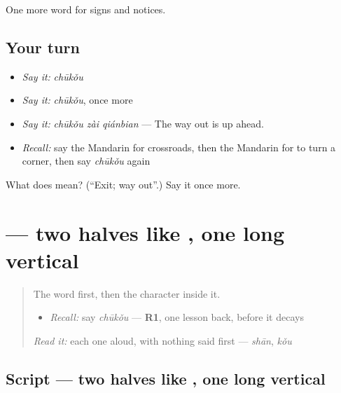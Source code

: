\begin{grammarlens}[title={What you've built}]
One more word for signs and notices.
\end{grammarlens}

\subsection*{Your turn}
\begin{itemize}
\raggedright
  \item \emph{Say it:} \emph{chūkǒu}
  \item \emph{Say it:} \emph{chūkǒu}, once more
  \item \emph{Say it:} \emph{chūkǒu zài qiánbian} — The way out is up ahead.
  \item \emph{Recall:} say the Mandarin for crossroads, then the Mandarin for to turn a corner, then say \emph{chūkǒu} again
\end{itemize}

\begin{tcolorbox}[breakable,colback=teal!4,colframe=teal!35!black,title={Before you move on}]
What does  mean? (\textquotedblleft{}Exit; way out\textquotedblright{}.) Say it once more.
\end{tcolorbox}
\section[\texorpdfstring{\zh{出} (chū)}{出 (chū)}]{ — two halves like , one long vertical}

\label{lesson:ZH-W112-chu}



\begin{quote}
The word first, then the character inside it.

\begin{itemize}
\raggedright
  \item \emph{Recall:} say \emph{chūkǒu} — \textbf{R1}, one lesson back, before it decays
\end{itemize}

\begin{quote}
 
\end{quote}

\emph{Read it:} each one aloud, with nothing said first — \emph{shān}, \emph{kǒu}
\end{quote}

\subsection*{Script — two halves like , one long vertical}

